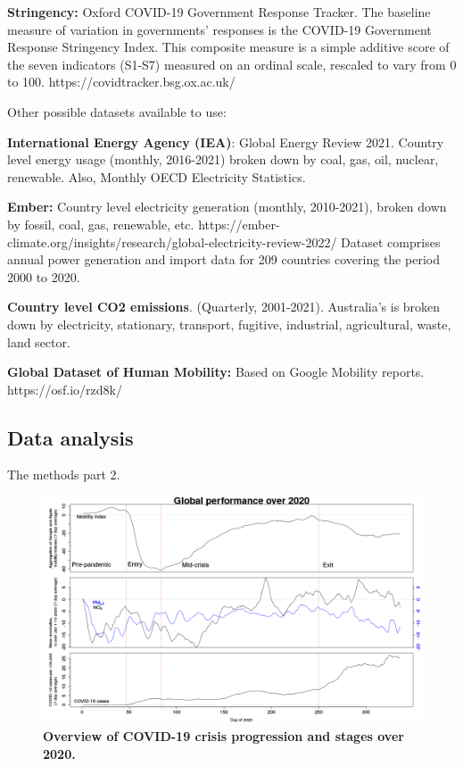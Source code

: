 \documentclass[preprint,12pt]{elsarticle}
\begin{document}
\textbf{Stringency: } Oxford COVID-19 Government Response Tracker. The baseline measure of variation in governments' responses is the COVID-19 Government Response Stringency Index. This composite measure is a simple additive score of the seven indicators (S1-S7) measured on an ordinal scale, rescaled to vary from 0 to 100.
https://covidtracker.bsg.ox.ac.uk/


Other possible datasets available to use:

\textbf{International Energy Agency (IEA)}: Global Energy Review 2021. 
Country level energy usage (monthly, 2016-2021) broken down by coal, gas, oil, nuclear, renewable.
Also, Monthly OECD Electricity Statistics. 

\textbf{Ember:} Country level electricity generation (monthly, 2010-2021), broken down by fossil, coal, gas, renewable, etc.
https://ember-climate.org/insights/research/global-electricity-review-2022/
Dataset comprises annual power generation and import data for 209 countries covering the period 2000 to 2020. 

\textbf{Country level CO2 emissions}. (Quarterly, 2001-2021). Australia's is broken down by electricity, stationary, transport, fugitive, industrial, agricultural, waste, land sector.

\textbf{Global Dataset of Human Mobility:} Based on Google Mobility reports.
https://osf.io/rzd8k/




\subsection*{Data analysis}
The methods part 2.

\begin{figure}
\centering
\includegraphics[trim={0 0 15 20},clip,scale=0.45]{Images/LancetPHOverall.png}
\caption{\bf Overview of COVID-19 crisis progression and stages over 2020.}
 \label{fig:stages}
\end{figure}
\end{document}
